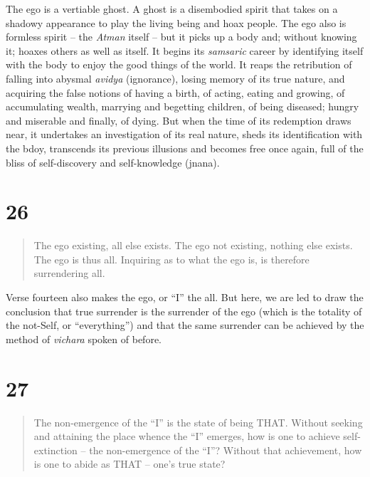 \documentclass[12pt]{report}
\begin{document}
The ego is a vertiable ghost. A ghost is a disembodied spirit that
takes on a shadowy appearance to play the living being and hoax
people. The ego also is formless spirit -- the \emph{Atman} itself --
but it picks up a body and; without knowing it; hoaxes others as well
as itself. It begins its \emph{samsaric} career by identifying itself
with the body to enjoy the good things of the world. It reaps the
retribution of falling into abysmal \emph{avidya} (ignorance), losing
memory of its true nature, and acquiring the false notions of having a
birth, of acting, eating and growing, of accumulating wealth, marrying
and begetting children, of being diseased; hungry and miserable and
finally, of dying. But when the time of its redemption draws near, it
undertakes an investigation of its real nature, sheds its
identification with the bdoy, transcends its previous illusions and
becomes free once again, full of the bliss of self-discovery and
self-knowledge (jnana). 


\section{26}

\begin{quote}
  The ego existing, all else exists. The ego not existing, nothing
  else exists. The ego is thus all. Inquiring as to what the ego is,
  is therefore surrendering all.
\end{quote}

Verse fourteen also makes the ego, or ``I'' the all. But here, we are
led to draw the conclusion that true surrender is the surrender of the
ego (which is the totality of the not-Self, or ``everything'') and
that the same surrender can be achieved by the method of
\emph{vichara} spoken of before.


\section{27}

\begin{quote}

  The non-emergence of the ``I'' is the state of being THAT. Without
  seeking and attaining the place whence the ``I'' emerges, how is one
  to achieve self-extinction -- the non-emergence of the ``I''?
  Without that achievement, how is one to abide as THAT -- one's true
  state? 

\end{quote}
\end{document}
